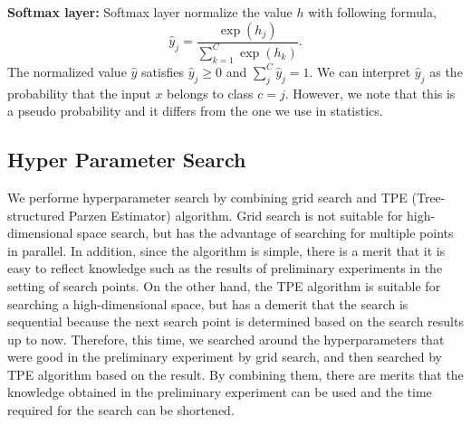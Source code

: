 \documentclass[useamsfonts]{pasj01}
\begin{document}
{\bf Softmax layer:}
Softmax layer normalize the value $h$ with following formula,
\begin{equation}
    \hat{y}_j = \frac{\exp \left( h_j \right)}{\sum_{k=1}^C \exp \left( h_k \right)}.
\end{equation}
The normalized value $\hat{y}$ satisfies $\hat{y}_j \geq 0$ and $\sum_j^C \hat{y}_j =1$.
We can interpret $\hat{y}_j$ as the probability that the input $x$ belongs to  class $c=j$.
However, we note that this is a pseudo probability and it differs from the one we use in statistics.
  
\subsection{Hyper Parameter Search}\label{hyperparametersearch}
We performe hyperparameter search by combining grid search and TPE (Tree-structured Parzen Estimator) algorithm.
Grid search is not suitable for high-dimensional space search, but has the advantage of searching for multiple points in parallel.
In addition, since the algorithm is simple, there is a merit that it is easy to reflect knowledge such as the results of preliminary experiments in the setting of search points.
On the other hand, the TPE algorithm is suitable for searching a high-dimensional space, but has a demerit that the search is sequential because the next search point is determined based on the search results up to now.
Therefore, this time, we searched around the hyperparameters that were good in the preliminary experiment by grid search, and then searched by TPE algorithm based on the result.
By combining them, there are merits that the knowledge obtained in the preliminary experiment can be used and the time required for the search can be shortened.
\end{document}
